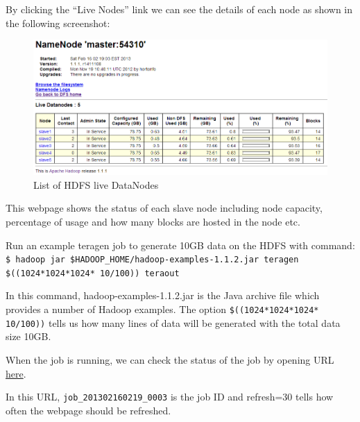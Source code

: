 By clicking the ``Live Nodes'' link we can see the details of each node as shown in the following screenshot:
\begin{figure}[h]
  \centering
  \includegraphics[width=.8\textwidth]{figs/5163os_03_05.png}
  \caption{List of HDFS live DataNodes}\label{fig:hdfs.datanodes}
\end{figure} 


This webpage shows the status of each slave node including node capacity, percentage of usage and how many blocks are hosted in the node etc.

Run an example teragen job to generate 10GB data on the HDFS with command:\\
\verb|$ hadoop jar $HADOOP_HOME/hadoop-examples-1.1.2.jar teragen $((1024*1024*1024* 10/100)) teraout|

In this command, hadoop-examples-1.1.2.jar is the Java archive file which provides a number of Hadoop examples. The option \verb|$((1024*1024*1024* 10/100))| tells us how many lines of data will be generated with the total data size 10GB.

When the job is running, we can check the status of the job by opening URL \href{http://master:50030/jobdetails.jsp?jobid=job_201302160219_0003&refresh=30}{here}.

In this URL, \verb|job_201302160219_0003| is the job ID and refresh=30 tells how often the webpage should be refreshed.

